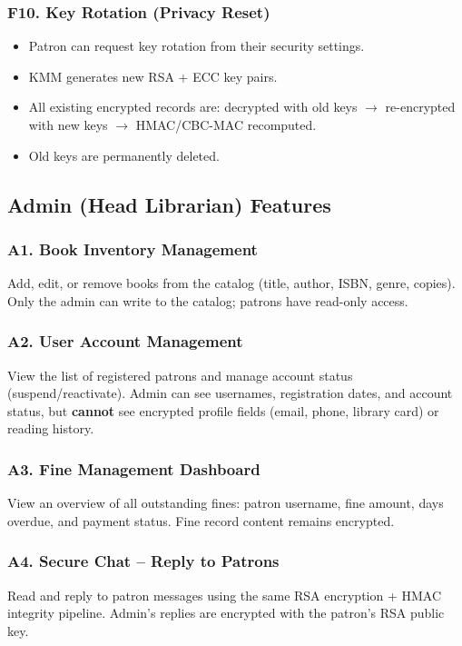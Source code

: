 \documentclass[12pt]{article}
\begin{document}
\subsubsection{F10. Key Rotation (Privacy Reset)}
\begin{itemize}
    \item Patron can request key rotation from their security settings.
    \item KMM generates new RSA + ECC key pairs.
    \item All existing encrypted records are: decrypted with old keys $\rightarrow$ re-encrypted with new keys $\rightarrow$ HMAC/CBC-MAC recomputed.
    \item Old keys are permanently deleted.
\end{itemize}

\subsection{Admin (Head Librarian) Features}

\subsubsection{A1. Book Inventory Management}
Add, edit, or remove books from the catalog (title, author, ISBN, genre, copies). Only the admin can write to the catalog; patrons have read-only access.

\subsubsection{A2. User Account Management}
View the list of registered patrons and manage account status (suspend/reactivate). Admin can see usernames, registration dates, and account status, but \textbf{cannot} see encrypted profile fields (email, phone, library card) or reading history.

\subsubsection{A3. Fine Management Dashboard}
View an overview of all outstanding fines: patron username, fine amount, days overdue, and payment status. Fine record content remains encrypted.

\subsubsection{A4. Secure Chat -- Reply to Patrons}
Read and reply to patron messages using the same RSA encryption + HMAC integrity pipeline. Admin's replies are encrypted with the patron's RSA public key.
\end{document}
